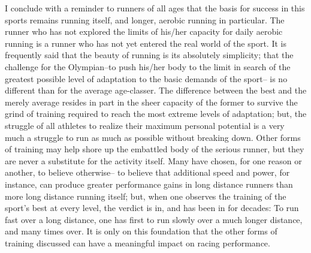 I conclude with a reminder to runners of all ages that the basis for success in this sports remains running itself, and longer, aerobic running in particular. The runner who has not explored the limits of his/her capacity for daily aerobic running is a runner who has not yet entered the real world of the sport. It is frequently said that the beauty of running is its absolutely simplicity; that the challenge for the Olympian--to push his/her body to the limit in search of the greatest possible level of adaptation to the basic demands of the sport-- is no different than for the average age-classer. The difference between the best and the merely average resides in part in the sheer capacity of the former to survive the grind of training required to reach the most extreme levels of adaptation; but, the struggle of all athletes to realize their maximum personal potential is a very much a struggle to run as much as possible without breaking down. Other forms of training may help shore up the embattled body of the serious runner, but they are never a substitute for the activity itself. Many have chosen, for one reason or another, to believe otherwise-- to believe that additional speed and power, for instance, can produce greater performance gains in long distance runners than more long distance running itself; but, when one observes the training of the sport's best at every level, the verdict is in, and has been in for decades: To run fast over a long distance, one has first to run slowly over a much longer distance, and many times over. It is only on this foundation that the other forms of training discussed can have a meaningful impact on racing performance.
